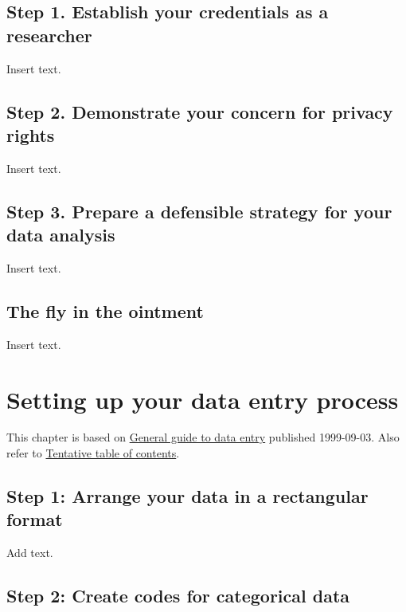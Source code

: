 \documentclass[
  letterpaper,
  DIV=11,
  numbers=noendperiod]{scrreprt}
\begin{document}
\section{Step 1. Establish your credentials as a
researcher}\label{step-1.-establish-your-credentials-as-a-researcher}

Insert text.

\section{Step 2. Demonstrate your concern for privacy
rights}\label{step-2.-demonstrate-your-concern-for-privacy-rights}

Insert text.

\section{Step 3. Prepare a defensible strategy for your data
analysis}\label{step-3.-prepare-a-defensible-strategy-for-your-data-analysis}

Insert text.

\section{The fly in the ointment}\label{the-fly-in-the-ointment-4}

Insert text.


\chapter{Setting up your data entry
process}\label{setting-up-your-data-entry-process}

This chapter is based on
\href{http://www.pmean.com/99/entry.html}{General guide to data entry}
published 1999-09-03. Also refer to
\href{http://www.pmean.com/10/Contents.html}{Tentative table of
contents}.

\section{Step 1: Arrange your data in a rectangular
format}\label{step-1-arrange-your-data-in-a-rectangular-format}

Add text.

\section{Step 2: Create codes for categorical
data}\label{step-2-create-codes-for-categorical-data}
\end{document}
